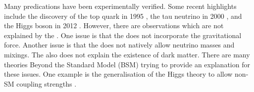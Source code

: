 Many \SM predications have been experimentally verified. Some recent highlights include the discovery of the top quark in 1995 \cite{Abachi:1995iq}, the tau neutrino in 2000 \cite{Kodama:2000mp}, and the Higgs boson in 2012 \cite{Aad:2012tfa,Chatrchyan:2012ufa}. However, there are observations which are not explained by the \SM. One issue is that the \SM does not incorporate the gravitational force. Another issue is that the \SM does not natively allow neutrino masses and mixings. The \SM also does not explain the existence of dark matter. There are many theories Beyond the Standard Model (BSM) trying to provide an explanation for these issues. One example is the generalisation of the Higgs theory to allow non-SM coupling strengths \cite{Kaplan:1983fs,Goldberger:2008zz}.

